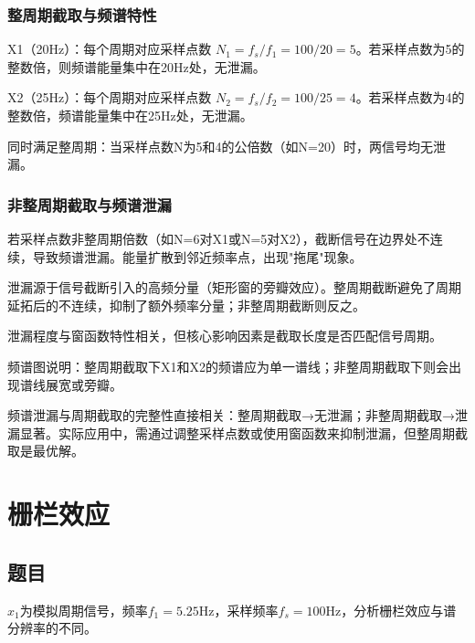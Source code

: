 \documentclass{ctexart}
\begin{document}
			\subsubsection{整周期截取与频谱特性}
			X1（20Hz）：每个周期对应采样点数 $N_1 = f_s/f_1 = 100/20 = 5$。若采样点数为5的整数倍，则频谱能量集中在20Hz处，无泄漏。\par
			X2（25Hz）：每个周期对应采样点数 $N_2 = f_s/f_2 = 100/25 = 4$。若采样点数为4的整数倍，频谱能量集中在25Hz处，无泄漏。\par
			同时满足整周期：当采样点数N为5和4的公倍数（如N=20）时，两信号均无泄漏。
			\subsubsection{非整周期截取与频谱泄漏}
			若采样点数非整周期倍数（如N=6对X1或N=5对X2），截断信号在边界处不连续，导致频谱泄漏。能量扩散到邻近频率点，出现"拖尾"现象。\par
			泄漏源于信号截断引入的高频分量（矩形窗的旁瓣效应）。整周期截断避免了周期延拓后的不连续，抑制了额外频率分量；非整周期截断则反之。\par
			泄漏程度与窗函数特性相关，但核心影响因素是截取长度是否匹配信号周期。\par
			
			频谱图说明：整周期截取下X1和X2的频谱应为单一谱线；非整周期截取下则会出现谱线展宽或旁瓣。\par
			频谱泄漏与周期截取的完整性直接相关：整周期截取→无泄漏；非整周期截取→泄漏显著。实际应用中，需通过调整采样点数或使用窗函数来抑制泄漏，但整周期截取是最优解。
			
	\newpage
	\section{栅栏效应}
		\subsection{题目}
			$x_1$为模拟周期信号，频率$f_1 =5.25$Hz，采样频率$f_s=100$Hz，分析栅栏效应与谱分辨率的不同。
\end{document}
